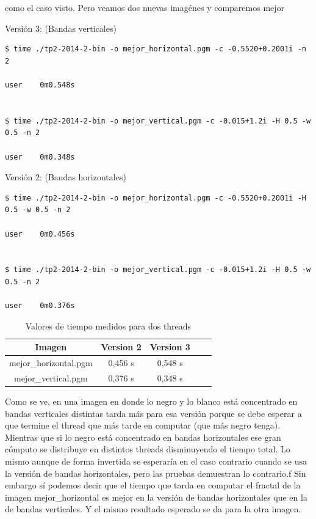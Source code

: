 \documentclass[a4paper,10pt]{article}
\begin{document}
como el caso visto.
Pero veamos dos nuevas imagénes y comparemos mejor

Versión 3: (Bandas verticales)
\begin{verbatim}
$ time ./tp2-2014-2-bin -o mejor_horizontal.pgm -c -0.5520+0.2001i -n 2

user	0m0.548s


$ time ./tp2-2014-2-bin -o mejor_vertical.pgm -c -0.015+1.2i -H 0.5 -w 0.5 -n 2

user	0m0.348s
\end{verbatim}

Versión 2: (Bandas horizontales)
\begin{verbatim}
$ time ./tp2-2014-2-bin -o mejor_horizontal.pgm -c -0.5520+0.2001i -H 0.5 -w 0.5 -n 2

user	0m0.456s


$ time ./tp2-2014-2-bin -o mejor_vertical.pgm -c -0.015+1.2i -H 0.5 -w 0.5 -n 2

user	0m0.376s
\end{verbatim}

\begin{table} [htbHp]
\begin{center}
\begin{tabular}{|c|c|c|c|c|}\hline
Imagen	&Version 2	&Version 3	\\\hline
mejor\_horizontal.pgm	&0,456 s	&0,548 s	\\\hline
mejor\_vertical.pgm	&0,376 s	&0,348 s	\\\hline
\end{tabular}
\end{center}
\caption{Valores de tiempo medidos para dos threads}
\end{table}

Como se ve, en una imagen en donde lo negro y lo blanco está concentrado en bandas verticales distintas tarda más para esa versión porque se debe esperar a que termine el thread que más tarde en computar (que más negro tenga). Mientras que si lo negro está concentrado en bandas horizontales ese gran cómputo se distribuye en distintos threads disminuyendo el tiempo total. Lo mismo aunque de forma invertida se esperaría en el caso contrario cuando se usa la versión de bandas horizontales, pero las pruebas demuestran lo contrario.f
Sin embargo sí podemos decir que el tiempo que tarda en computar el fractal de la imagen mejor\_horizontal es mejor en la versión de bandas horizontales que en la de bandas verticales. Y el mismo resultado esperado se da para la otra imagen.
\end{document}
